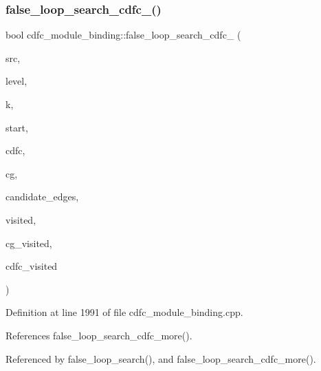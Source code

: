 \subsubsection{\texorpdfstring{false\+\_\+loop\+\_\+search\+\_\+cdfc\+\_()}{false\_loop\_search\_cdfc\_1()}}
{\footnotesize\ttfamily bool cdfc\+\_\+module\+\_\+binding\+::false\+\_\+loop\+\_\+search\+\_\+cdfc\+\_ (\begin{DoxyParamCaption}\item[{\hyperlink{cdfc__module__binding_8hpp_affa85aa857f7ad00e0ed52c20fcd863b}{cdfc\+\_\+vertex}}]{src,  }\item[{unsigned int}]{level,  }\item[{unsigned}]{k,  }\item[{\hyperlink{cdfc__module__binding_8hpp_affa85aa857f7ad00e0ed52c20fcd863b}{cdfc\+\_\+vertex}}]{start,  }\item[{const \hyperlink{cdfc__module__binding_8hpp_a3f94e2158e9a11882a35140b0365f1ad}{cdfc\+\_\+graph\+Const\+Ref} \&}]{cdfc,  }\item[{const \hyperlink{cdfc__module__binding_8hpp_a3f94e2158e9a11882a35140b0365f1ad}{cdfc\+\_\+graph\+Const\+Ref} \&}]{cg,  }\item[{std\+::deque$<$ \hyperlink{cdfc__module__binding_8hpp_a5ef126c5daeb3e4b387d23088ebce43e}{cdfc\+\_\+edge} $>$ \&}]{candidate\+\_\+edges,  }\item[{std\+::vector$<$ bool $>$ \&}]{visited,  }\item[{std\+::vector$<$ bool $>$ \&}]{cg\+\_\+visited,  }\item[{std\+::vector$<$ bool $>$ \&}]{cdfc\+\_\+visited }\end{DoxyParamCaption})\hspace{0.3cm}{\ttfamily [protected]}}



Definition at line 1991 of file cdfc\+\_\+module\+\_\+binding.\+cpp.



References false\+\_\+loop\+\_\+search\+\_\+cdfc\+\_\+more().



Referenced by false\+\_\+loop\+\_\+search(), and false\+\_\+loop\+\_\+search\+\_\+cdfc\+\_\+more().

